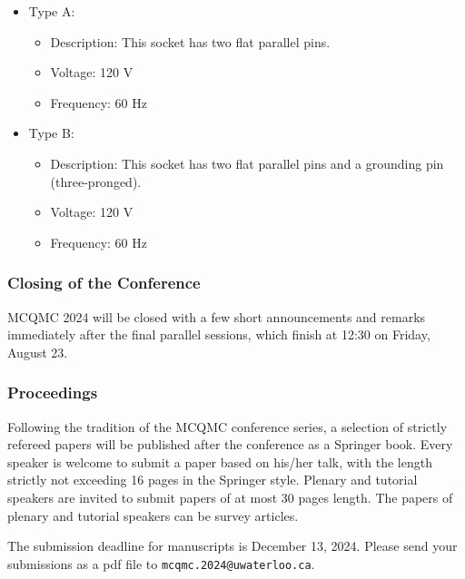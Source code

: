 \begin{itemize}
    \item Type A:
    \begin{itemize}
        \item Description: This socket has two flat parallel pins.
        \item Voltage: 120 V
        \item Frequency: 60 Hz
    \end{itemize}

    \item Type B:
    \begin{itemize}
        \item Description: This socket has two flat parallel pins and a grounding pin (three-pronged).
        \item Voltage: 120 V
        \item Frequency: 60 Hz
    \end{itemize}
\end{itemize}


\subsubsection{Closing of the Conference}

MCQMC 2024 will be closed with a few short announcements and remarks
immediately after the final parallel sessions, which finish at 12:30 on Friday, August 23.



\subsubsection{Proceedings}

Following the tradition of the MCQMC conference series, a selection of
strictly refereed papers will be published after the conference as a
Springer book. Every speaker is welcome to submit a paper based on
his/her talk, with the length strictly not exceeding 16 pages in the Springer style. 
Plenary and tutorial speakers are invited to submit papers of at most 30 pages length. The papers of 
plenary and tutorial speakers can be survey articles.

The submission deadline for manuscripts is December 13, 2024. Please send your submissions as a pdf file 
to \texttt{mcqmc.2024@uwaterloo.ca}.

